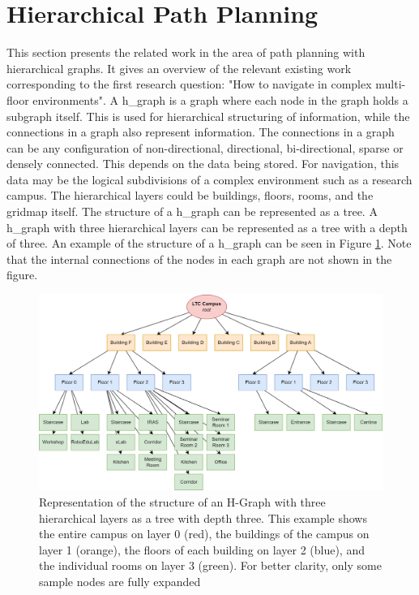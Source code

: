 \section{Hierarchical Path Planning}
\label{sec:hierarchical_planning}
This section presents the related work in the area of path planning with hierarchical graphs. It gives an overview of the relevant existing work corresponding to the first research question: "How to navigate in complex multi-floor environments". 
A \Gls{h_graph} is a graph where each node in the graph holds a subgraph itself. This is used for hierarchical structuring of information, while the connections in a graph also represent information. The connections in a graph can be any configuration of non-directional, directional, bi-directional, sparse or densely connected. This depends on the data being stored. For navigation, this data may be the logical subdivisions of a complex environment such as a research campus. The hierarchical layers could be buildings, floors, rooms, and the gridmap itself. The structure of a \gls{h_graph} can be represented as a tree. A \gls{h_graph} with three hierarchical layers can be represented as a tree with a depth of three. An example of the structure of a \gls{h_graph} can be seen in Figure \ref{fig:h_graph}. Note that the internal connections of the nodes in each graph are not shown in the figure. 

\begin{figure}[h]
    \centering
    \includegraphics[width=\textwidth]{figures/20_state_of_the_art/hierarchical_graph.png}
    \caption[Representation of the structure of an H-Graph as tree]{Representation of the structure of an H-Graph with three hierarchical layers as a tree with depth three. This example shows the entire campus on layer 0 (red), the buildings of the campus on layer 1 (orange), the floors of each building on layer 2 (blue), and the individual rooms on layer 3 (green). For better clarity, only some sample nodes are fully expanded}
    \label{fig:h_graph}
\end{figure}

